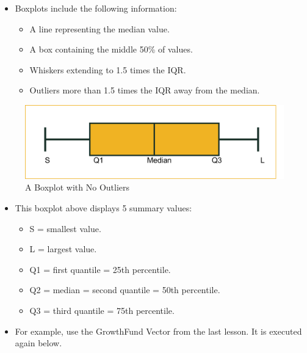 \documentclass[
  letterpaper,
  DIV=11,
  numbers=noendperiod]{scrreprt}
\providecommand{\tightlist}{%
  \setlength{\itemsep}{0pt}\setlength{\parskip}{0pt}}\usepackage{longtable,booktabs,array}
\begin{document}
\begin{itemize}
\tightlist
\item
  Boxplots include the following information:

  \begin{itemize}
  \tightlist
  \item
    A line representing the median value.
  \item
    A box containing the middle 50\% of values.
  \item
    Whiskers extending to 1.5 times the IQR.
  \item
    Outliers more than 1.5 times the IQR away from the median.
  \end{itemize}
\end{itemize}

\begin{figure}[H]

{\centering \includegraphics{Pictures/Ch3/Boxplot2.png}

}

\caption{A Boxplot with No Outliers}

\end{figure}%

\begin{itemize}
\tightlist
\item
  This boxplot above displays 5 summary values:

  \begin{itemize}
  \tightlist
  \item
    S = smallest value.
  \item
    L = largest value.
  \item
    Q1 = first quantile = 25th percentile.
  \item
    Q2 = median = second quantile = 50th percentile.
  \item
    Q3 = third quantile = 75th percentile.
  \end{itemize}
\item
  For example, use the GrowthFund Vector from the last lesson. It is
  executed again below.
\end{itemize}
\end{document}
